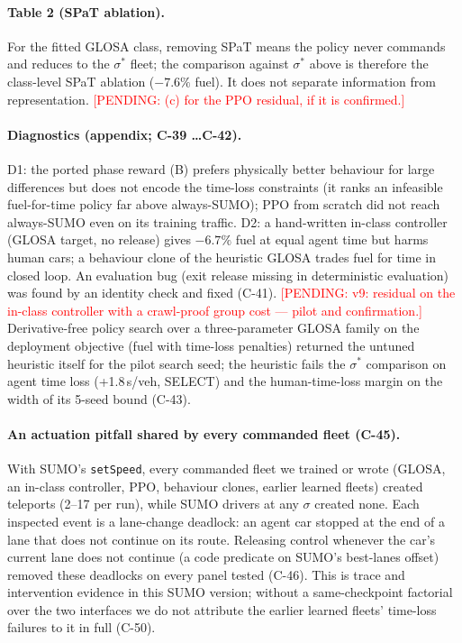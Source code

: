 \documentclass[11pt]{article}
\newcommand{\pending}[1]{\textcolor{red}{[PENDING: #1]}}
\begin{document}
\paragraph{Table 2 (SPaT ablation).} For the fitted GLOSA class, removing SPaT means the policy never commands and reduces to the
$\sigma^*$ fleet; the comparison against $\sigma^*$ above is therefore the class-level SPaT ablation ($-7.6\%$ fuel). It does not separate
information from representation. \pending{(c) for the PPO residual, if it is confirmed.}
\paragraph{Diagnostics (appendix; C-39 \dots C-42).} D1: the ported phase reward (B) prefers physically better behaviour for large
differences but does not encode the time-loss constraints (it ranks an infeasible fuel-for-time policy far above always-SUMO); PPO from
scratch did not reach always-SUMO even on its training traffic. D2: a hand-written in-class controller (GLOSA target, no release) gives
$-6.7\%$ fuel at equal agent time but harms human cars; a behaviour clone of the heuristic GLOSA trades fuel for time in closed loop.
An evaluation bug (exit release missing in deterministic evaluation) was found by an identity check and fixed (C-41).
\pending{v9: residual on the in-class controller with a crawl-proof group cost --- pilot and confirmation.}
Derivative-free policy search over a three-parameter GLOSA family on the deployment objective (fuel with time-loss penalties) returned
the untuned heuristic itself for the pilot search seed; the heuristic fails the $\sigma^*$ comparison on agent time loss (+1.8\,s/veh,
SELECT) and the human-time-loss margin on the width of its 5-seed bound (C-43).
\paragraph{An actuation pitfall shared by every commanded fleet (C-45).} With SUMO's \texttt{setSpeed}, every commanded fleet we
trained or wrote (GLOSA, an in-class controller, PPO, behaviour clones, earlier learned fleets) created teleports (2--17 per run), while
SUMO drivers at any $\sigma$ created none. Each inspected event is a lane-change deadlock: an agent car stopped at the end of a lane that does
not continue on its route. Releasing control whenever the car's current lane does not continue (a code predicate on SUMO's best-lanes
offset) removed these deadlocks on every panel tested (C-46). This is trace and intervention evidence in this SUMO version; without a
same-checkpoint factorial over the two interfaces we do not attribute the earlier learned fleets' time-loss failures to it in full (C-50).
\end{document}
